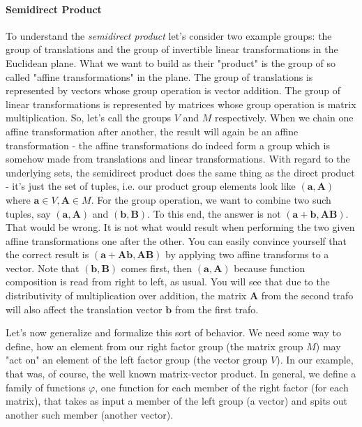 \paragraph{Semidirect Product}
To understand the \emph{semidirect product} let's consider two example groups: the group of translations and the group of invertible linear transformations in the Euclidean plane. What we want to build as their "product" is the group of so called "affine transformations" in the plane. The group of translations is represented by vectors whose group operation is vector addition. The group of linear transformations is represented by matrices whose group operation is matrix multiplication. So, let's call the groups $V$ and $M$ respectively. When we chain one affine transformation after another, the result will again be an affine transformation - the affine transformations do indeed form a group which is somehow made from translations and linear transformations. With regard to the underlying sets, the semidirect product does the same thing as the direct product - it's just the set of tuples, i.e. our product group elements look like $(\mathbf{a},\mathbf{A})$ where $\mathbf{a} \in V, \mathbf{A} \in M$. For the group operation, we want to combine two such tuples, say  $(\mathbf{a},\mathbf{A})$ and $(\mathbf{b},\mathbf{B})$. To this end, the answer is not $(\mathbf{a + b},\mathbf{A B})$. That would be wrong. It is not what would result when performing the two given affine transformations one after the other. You can easily convince yourself that the correct result is $(\mathbf{a + A b},\mathbf{A B})$ by applying two affine transforms to a vector. Note that $(\mathbf{b},\mathbf{B})$ comes first, then $(\mathbf{a},\mathbf{A})$ because function composition is read from right to left, as usual. You will see that due to the distributivity of multiplication over addition, the matrix $\mathbf{A}$ from the second trafo will also affect the translation vector $\mathbf{b}$ from the first trafo. 

\medskip
Let's now generalize and formalize this sort of behavior. We need some way to define, how an element from our right factor group (the matrix group $M$) may "act on" an element of the left factor group (the vector group $V$). In our example, that was, of course, the well known matrix-vector product. In general, we define a family of functions $\varphi$, one function for each member of the right factor (for each matrix), that takes as input a member of the left group (a vector) and spits out another such member (another vector). 

